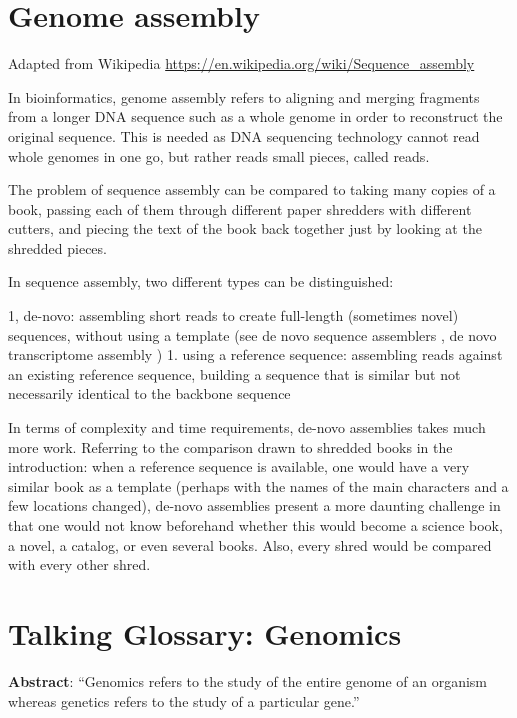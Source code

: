 \documentclass[
]{book}
\begin{document}
\hypertarget{genome-assembly}{%
\section{Genome assembly}\label{genome-assembly}}

Adapted from Wikipedia
\url{https://en.wikipedia.org/wiki/Sequence_assembly}

In bioinformatics, genome assembly refers to aligning and merging fragments from a longer DNA sequence such as a whole genome in order to reconstruct the original sequence. This is needed as DNA sequencing technology cannot read whole genomes in one go, but rather reads small pieces, called reads.

The problem of sequence assembly can be compared to taking many copies of a book, passing each of them through different paper shredders with different cutters, and piecing the text of the book back together just by looking at the shredded pieces.

In sequence assembly, two different types can be distinguished:

1, de-novo: assembling short reads to create full-length (sometimes novel) sequences, without using a template (see de novo sequence assemblers , de novo transcriptome assembly )
1. using a reference sequence: assembling reads against an existing reference sequence, building a sequence that is similar but not necessarily identical to the backbone sequence

In terms of complexity and time requirements, de-novo assemblies takes much more work. Referring to the comparison drawn to shredded books in the introduction: when a reference sequence is available, one would have a very similar book as a template (perhaps with the names of the main characters and a few locations changed), de-novo assemblies present a more daunting challenge in that one would not know beforehand whether this would become a science book, a novel, a catalog, or even several books. Also, every shred would be compared with every other shred.

\hypertarget{talking-glossary-genomics}{%
\section{Talking Glossary: Genomics}\label{talking-glossary-genomics}}

\textbf{Abstract}: ``Genomics refers to the study of the entire genome of an organism whereas genetics refers to the study of a particular gene.''
\end{document}
